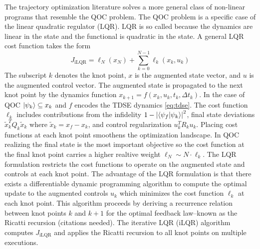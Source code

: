 The trajectory optimization
literature solves a more general class of non-linear programs that resemble
the QOC problem. The QOC
problem is a specific case of the linear quadratic regulator (LQR).
LQR is so called because the dynamics are linear in the state and
the functional is quadratic in the state. A general LQR cost
function takes the form
\begin{equation}
  J_{\textrm{iLQR}} = \ell_{N}({x}_{N})
  + \sum_{k = 0}^{N - 1} \ell_{k}({x}_{k}, u_{k})
\end{equation}
The subscript $k$ denotes the knot point, $x$ is the augmented state vector,
and $u$ is the augmented control vector. The augmented state is propagated
to the next knot point by the dynamics function $x_{k + 1} = f(x_{k}, u_{k}, t_{k}, \Delta t_{k})$.
In the case of QOC $\ket{\psi_{k}} \subseteq x_{k}$
and $f$ encodes the TDSE dynamics \eqref{eq:tdse}. The
cost function $\ell_{k}$ includes contributions from the infidelity
$1 - {\lvert \braket{\psi_{f} \lvert \psi_{k}} \rvert}^{2}$, final state deviations
$\tilde{x}^{T}_{k} Q_{k} \tilde{x}_{k}$ where $\tilde{x}_{k} = x_{f} - x_{k}$,
and control regularization $u^{T}_{k} R_{k} u_{k}$.
Placing cost functions at each knot point smoothens the optimization
landscape. In QOC realizing the final state
is the most important objective so the cost function at the final knot point
carries a higher realtive weight $\ell_{N} \sim N \cdot \ell_{k}$.
The LQR formulation restricts the cost functions to operate on the augmented
state and controls at each knot point. The advantage of the LQR formulation
is that there exists a differentiable dynamic programming algorithm to compute the
optimal update to the augmented controls $u_{k}$ which minimizes the cost
function $\ell_{k}$ at each knot point. This algorithm proceeds by deriving a
recurrence relation between knot points $k$ and $k + 1$ for the optimal
feedback law--known as the Ricatti recursion (citations needed). The
iterative LQR (iLQR) algorithm computes $J_{\textrm{iLQR}}$
and applies the Ricatti recursion to all knot points on multiple
executions.

